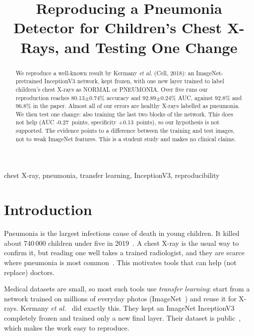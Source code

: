 \documentclass[conference]{IEEEtran}
\newcommand{\RepAcc}{80.13$\pm$0.74}
\newcommand{\RepAUC}{92.89$\pm$0.24}
\newcommand{\DAUC}{-0.27}
\newcommand{\DSpec}{+0.13}
\begin{document}
\title{Reproducing a Pneumonia Detector for Children's Chest X-Rays, and Testing One Change}

\author{
}

\maketitle

\begin{abstract}
We reproduce a well-known result by Kermany \emph{et al.} (Cell, 2018): an ImageNet-pretrained InceptionV3 network, kept frozen, with one new layer trained to label children's chest X-rays as NORMAL or PNEUMONIA. Over five runs our reproduction reaches \RepAcc\% accuracy and \RepAUC\% AUC, against 92.8\% and 96.8\% in the paper. Almost all of our errors are healthy X-rays labelled as pneumonia. We then test one change: also training the last two blocks of the network. This does not help (AUC \DAUC\ points, specificity \DSpec\ points), so our hypothesis is not supported. The evidence points to a difference between the training and test images, not to weak ImageNet features. This is a student study and makes no clinical claims.
\end{abstract}

\begin{IEEEkeywords}
chest X-ray, pneumonia, transfer learning, InceptionV3, reproducibility
\end{IEEEkeywords}

\section{Introduction}
Pneumonia is the largest infectious cause of death in young children. It killed about 740\,000 children under five in 2019~\cite{who}. A chest X-ray is the usual way to confirm it, but reading one well takes a trained radiologist, and they are scarce where pneumonia is most common~\cite{chexnet}. This motivates tools that can help (not replace) doctors.

Medical datasets are small, so most such tools use \emph{transfer learning}: start from a network trained on millions of everyday photos (ImageNet~\cite{imagenet}) and reuse it for X-rays. Kermany \emph{et al.}~\cite{kermany} did exactly this. They kept an ImageNet InceptionV3~\cite{inception} completely frozen and trained only a new final layer. Their dataset is public~\cite{mendeley}, which makes the work easy to reproduce.
\end{document}
